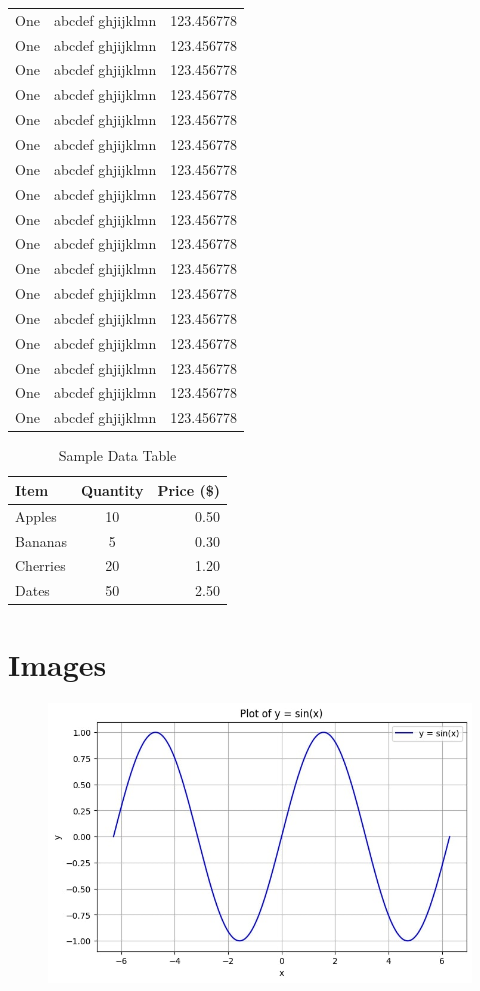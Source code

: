 {\begin{center}
\begin{longtable}{|l|l|l|}
		One & abcdef ghjijklmn & 123.456778 \\
		One & abcdef ghjijklmn & 123.456778 \\
		One & abcdef ghjijklmn & 123.456778 \\
		One & abcdef ghjijklmn & 123.456778 \\
		One & abcdef ghjijklmn & 123.456778 \\
		One & abcdef ghjijklmn & 123.456778 \\
		One & abcdef ghjijklmn & 123.456778 \\
		One & abcdef ghjijklmn & 123.456778 \\
		One & abcdef ghjijklmn & 123.456778 \\
		One & abcdef ghjijklmn & 123.456778 \\
		One & abcdef ghjijklmn & 123.456778 \\
		One & abcdef ghjijklmn & 123.456778 \\
		One & abcdef ghjijklmn & 123.456778 \\
		One & abcdef ghjijklmn & 123.456778 \\
		One & abcdef ghjijklmn & 123.456778 \\
		One & abcdef ghjijklmn & 123.456778 \\
		One & abcdef ghjijklmn & 123.456778 \\
	\end{longtable}
\end{center}
\begin{table}[ht]
	\centering
	\caption{Sample Data Table}
	\label{tab:sample}
	\begin{tabular}{l c r}
		\toprule
		\textbf{Item} & \textbf{Quantity} & \textbf{Price (\$)} \\
		\midrule
		Apples & 10 & 0.50 \\
		Bananas & 5 & 0.30 \\
		Cherries & 20 & 1.20 \\
		Dates & 50 & 2.50 \\
		\bottomrule
	\end{tabular}
\end{table}
\section{Images}
\begin{figure}
	\centering
	\includegraphics[width=0.7\linewidth]{figures/sinegraph}
	\caption{}
	\label{fig:sinegraph}
\end{figure}

}
